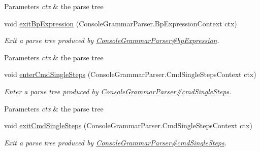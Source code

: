 \begin{DoxyCompactItemize}
\begin{DoxyCompactList}
\begin{DoxyParams}{Parameters}
{\em ctx} & the parse tree\\
\hline
\end{DoxyParams}
 \end{DoxyCompactList}\item 
void \hyperlink{classgov_1_1nasa_1_1jpf_1_1inspector_1_1client_1_1parser_1_1_console_grammar_base_listener_a5b0858ded1d835abe6d61a9cae8478ba}{exit\+Bp\+Expression} (Console\+Grammar\+Parser.\+Bp\+Expression\+Context ctx)
\begin{DoxyCompactList}\small\item\em Exit a parse tree produced by \hyperlink{classgov_1_1nasa_1_1jpf_1_1inspector_1_1client_1_1parser_1_1_console_grammar_parser_af8f413ff85d64783d9625af4ca4b1f06}{Console\+Grammar\+Parser\#bp\+Expression}.


\begin{DoxyParams}{Parameters}
{\em ctx} & the parse tree\\
\hline
\end{DoxyParams}
 \end{DoxyCompactList}\item 
void \hyperlink{classgov_1_1nasa_1_1jpf_1_1inspector_1_1client_1_1parser_1_1_console_grammar_base_listener_a4f3682ba0ba7c0ac3d67d86c0ceb73f4}{enter\+Cmd\+Single\+Steps} (Console\+Grammar\+Parser.\+Cmd\+Single\+Steps\+Context ctx)
\begin{DoxyCompactList}\small\item\em Enter a parse tree produced by \hyperlink{classgov_1_1nasa_1_1jpf_1_1inspector_1_1client_1_1parser_1_1_console_grammar_parser_a38d3ee70cf1cb2a77d6de42788941648}{Console\+Grammar\+Parser\#cmd\+Single\+Steps}.


\begin{DoxyParams}{Parameters}
{\em ctx} & the parse tree\\
\hline
\end{DoxyParams}
 \end{DoxyCompactList}\item 
void \hyperlink{classgov_1_1nasa_1_1jpf_1_1inspector_1_1client_1_1parser_1_1_console_grammar_base_listener_aa5d6a0249620d4131c06f95c5efb70ef}{exit\+Cmd\+Single\+Steps} (Console\+Grammar\+Parser.\+Cmd\+Single\+Steps\+Context ctx)
\begin{DoxyCompactList}\small\item\em Exit a parse tree produced by \hyperlink{classgov_1_1nasa_1_1jpf_1_1inspector_1_1client_1_1parser_1_1_console_grammar_parser_a38d3ee70cf1cb2a77d6de42788941648}{Console\+Grammar\+Parser\#cmd\+Single\+Steps}.



\end{DoxyCompactList}
\end{DoxyCompactItemize}
